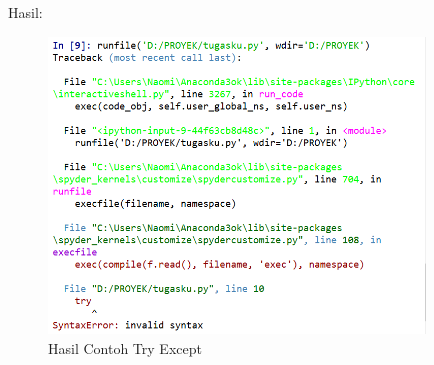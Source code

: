 \begin{enumerate}
    Hasil:
    \begin{figure}[!htbp]
    \centering
    \includegraphics[width=10cm]{gambar2/try1.png}
    \caption{Hasil Contoh Try Except}
    \end{figure}
\end{enumerate}

\newpage
